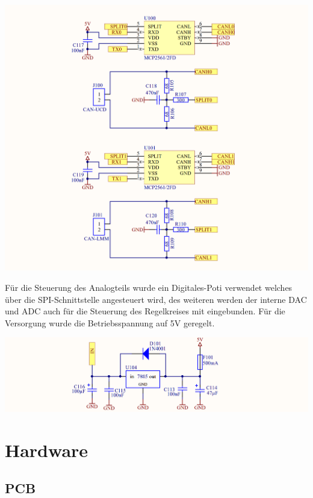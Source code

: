 \documentclass[paper=a4, 12pt]{scrreprt}
\begin{document}
		\begin{adjustbox}{center,caption={CAN-Transceiver},label={fig:CAN-Transceiver},nofloat=figure,vspace=\bigskipamount}
		\includegraphics[width=\textwidth]{img/CAN_Tranceiver.PNG}
		\end{adjustbox}
	Für die Steuerung des Analogteils wurde ein Digitales-Poti verwendet welches über die SPI-Schnittstelle angesteuert wird, des weiteren werden der interne DAC und ADC auch für die Steuerung des Regelkreises mit eingebunden. Für die Versorgung wurde die Betriebsspannung auf 5V geregelt.
	\begin{adjustbox}{center,caption={VoltageRegulator 7805 },label={fig:VoltageRegulator.PNG},nofloat=figure,vspace=\bigskipamount}
		\includegraphics[width=\textwidth]{img/VoltageRegulator.PNG}
	\end{adjustbox}
	\newpage
	
	\section{Hardware}\hfill \break
		\subsection{PCB}\hfill \break
	\newpage
	
\end{document}
